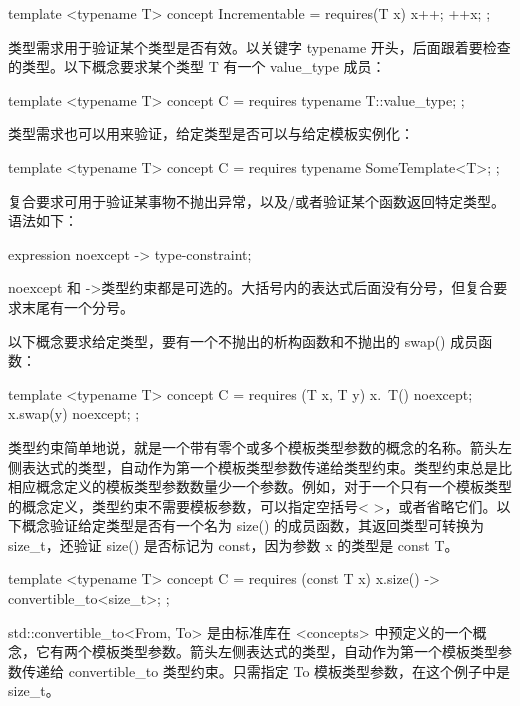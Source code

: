 \begin{cpp}
template <typename T>
concept Incrementable = requires(T x) { x++; ++x; };
\end{cpp}


类型需求用于验证某个类型是否有效。以关键字 typename 开头，后面跟着要检查的类型。以下概念要求某个类型 T 有一个 value\_type 成员：

\begin{cpp}
template <typename T>
concept C = requires { typename T::value_type; };
\end{cpp}

类型需求也可以用来验证，给定类型是否可以与给定模板实例化：

\begin{cpp}
template <typename T>
concept C = requires { typename SomeTemplate<T>; };
\end{cpp}


复合要求可用于验证某事物不抛出异常，以及/或者验证某个函数返回特定类型。语法如下：

\begin{cpp}
{ expression } noexcept -> type-constraint;
\end{cpp}

noexcept 和 ->类型约束都是可选的。大括号内的表达式后面没有分号，但复合要求末尾有一个分号。

以下概念要求给定类型，要有一个不抛出的析构函数和不抛出的 swap() 成员函数：

\begin{cpp}
template <typename T>
concept C = requires (T x, T y) {
    { x.~T()} noexcept;
    { x.swap(y) } noexcept;
};
\end{cpp}

类型约束简单地说，就是一个带有零个或多个模板类型参数的概念的名称。箭头左侧表达式的类型，自动作为第一个模板类型参数传递给类型约束。类型约束总是比相应概念定义的模板类型参数数量少一个参数。例如，对于一个只有一个模板类型的概念定义，类型约束不需要模板参数，可以指定空括号< >，或者省略它们。以下概念验证给定类型是否有一个名为 size() 的成员函数，其返回类型可转换为 size\_t，还验证 size() 是否标记为 const，因为参数 x 的类型是 const T。

\begin{cpp}
template <typename T>
concept C = requires (const T x) {
    { x.size() } -> convertible_to<size_t>;
};
\end{cpp}

std::convertible\_to<From, To> 是由标准库在 <concepts> 中预定义的一个概念，它有两个模板类型参数。箭头左侧表达式的类型，自动作为第一个模板类型参数传递给 convertible\_to 类型约束。只需指定 To 模板类型参数，在这个例子中是 size\_t。

